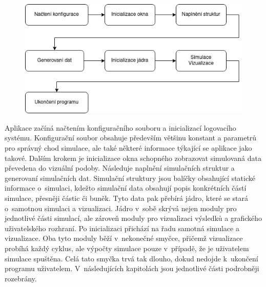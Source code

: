 \begin{figure}[hbt]
	\centering
	\captionsetup{justification=centering}
	\includegraphics[scale=0.6]{obrazky-figures/Simple.png}
	\label{fig:simpleStruct}
\end{figure}

Aplikace začíná načtením konfiguračního souboru a inicializací logovacího systému. Konfigurační soubor obsahuje především většinu konstant a parametrů pro správný chod simulace, ale také některé informace týkající se aplikace jako takové. Dalším krokem je inicializace okna schopného zobrazovat simulovaná data převedena do vizuální podoby. Následuje naplnění simulačních struktur a generovaní simulačních dat. Simulační struktury jsou balíčky obsahující statické informace o~simulaci, kdežto simulační data obsahují popis konkrétních částí simulace, přesněji částic či buněk. Tyto data pak přebírá jádro, které se stará o~samotnou simulaci a vizualizaci. Jádro v~sobě skrývá nejen moduly pro jednotlivé části simulací, ale zároveň moduly pro vizualizaci výsledků a grafického uživatelského rozhraní. Po inicializaci přichází na řadu samotná simulace a vizualizace. Oba tyto moduly běží v~nekonečné smyčce, přičemž vizualizace probíhá každý cyklus, ale výpočty simulace pouze v~případě, že je uživatelem simulace spuštěna. Celá tato smyčka trvá tak dlouho, dokud nedojde k~ukončení programu uživatelem. V~následujících kapitolách jsou jednotlivé části podrobněji rozebrány. 

